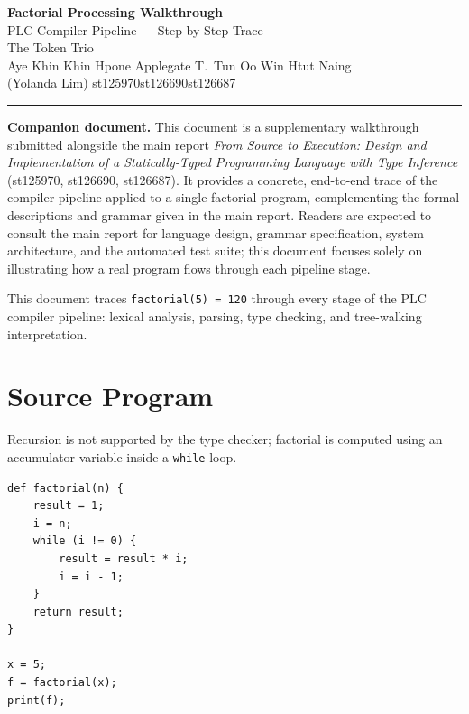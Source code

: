 \documentclass[11pt,a4paper]{article}
\begin{document}
\begin{center}
  {\LARGE\bfseries Factorial Processing Walkthrough}\\[6pt]
  {\large PLC Compiler Pipeline --- Step-by-Step Trace}\\[6pt]
  {\normalsize The Token Trio}\\[2pt]
  {\small Aye Khin Khin Hpone\quad\textbar\quad
           Applegate T.\ Tun Oo\quad\textbar\quad
           Win Htut Naing}\\[2pt]
  {\small (Yolanda Lim) st125970\quad\textbar\quad st126690\quad\textbar\quad st126687}
\end{center}

\vspace{0.2cm}\hrule\vspace{0.5cm}

\noindent\textbf{Companion document.}\quad
This document is a supplementary walkthrough submitted alongside the main
report \textit{From Source to Execution: Design and Implementation of a
Statically-Typed Programming Language with Type Inference}
(st125970, st126690, st126687).
It provides a concrete, end-to-end trace of the compiler pipeline applied to a
single factorial program, complementing the formal descriptions and grammar
given in the main report.
Readers are expected to consult the main report for language design, grammar
specification, system architecture, and the automated test suite; this document
focuses solely on illustrating how a real program flows through each pipeline
stage.

\medskip\noindent
This document traces \texttt{factorial(5) = 120} through every stage of the
PLC compiler pipeline: lexical analysis, parsing, type checking, and
tree-walking interpretation.

\section{Source Program}

Recursion is not supported by the type checker; factorial is computed
using an accumulator variable inside a \texttt{while} loop.

\begin{lstlisting}[caption={Iterative factorial program},label={lst:source}]
def factorial(n) {
    result = 1;
    i = n;
    while (i != 0) {
        result = result * i;
        i = i - 1;
    }
    return result;
}

x = 5;
f = factorial(x);
print(f);
\end{lstlisting}
\end{document}
